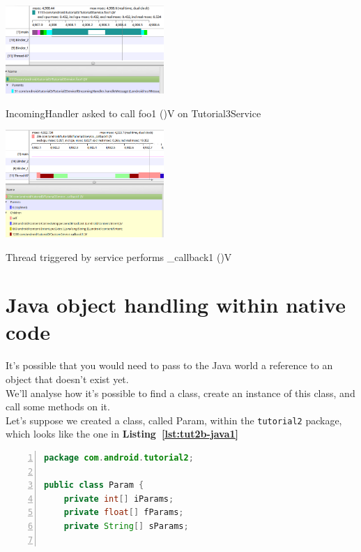 \documentclass[a4paper,10pt]{article}
\makeatletter
\newenvironment{figurehere}{\def\@captype{figure}\vspace{2ex}}{\vspace{2ex}}
\newcommand{\keyword}[1]{\texttt{#1}}
\newcommand{\refl}[1]{\textbf{Listing~\ref{#1}}}
\makeatother
\begin{document}
\begin{multicols}{2}
\begin{figurehere}
 \centering
 \includegraphics[width=6cm]{./figures/traceview02.png}
 \caption{IncomingHandler asked to call foo1 ()V on Tutorial3Service}
 \label{fig:tut3-traceview02}
\end{figurehere}

\begin{figurehere}
 \centering
 \includegraphics[width=6cm]{./figures/traceview03.png}
 \caption{Thread triggered by service performs \_callback1 ()V}
 \label{fig:tut3-traceview03}
\end{figurehere}


\section{Java object handling within native code}
It's possible that you would need to pass to the Java world a reference to an
object that doesn't exist yet.\\
We'll analyse how it's possible to find a class, create an instance of this
class, and call some methods on it.\\
Let's suppose we created a class, called Param, within the \keyword{tutorial2}
package, which looks like the one in \refl{lst:tut2b-java1}
\begin{lstlisting}[language=Java,
		   columns=fullflexible,
		   showstringspaces=false,
		   xleftmargin=15pt,
		   frame = l,
		   numbers=left,
		   commentstyle=\color{gray}\upshape,
		   caption=Java class Param,
		   label=lst:tut2b-java1]
package com.android.tutorial2;

public class Param {
	private int[] iParams;
	private float[] fParams;
	private String[] sParams;


\end{lstlisting}
\end{multicols}
\end{document}
